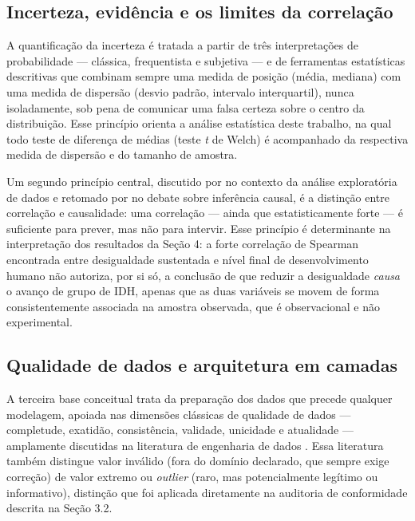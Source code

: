 \documentclass[11pt,a4paper]{article}
\begin{document}
\subsection{Incerteza, evidência e os limites da correlação}

A quantificação da incerteza é tratada a partir de três interpretações de probabilidade --- clássica, frequentista e subjetiva --- e de ferramentas estatísticas descritivas que combinam sempre uma medida de posição (média, mediana) com uma medida de dispersão (desvio padrão, intervalo interquartil), nunca isoladamente, sob pena de comunicar uma falsa certeza sobre o centro da distribuição. Esse princípio orienta a análise estatística deste trabalho, na qual todo teste de diferença de médias (teste \textit{t} de Welch) é acompanhado da respectiva medida de dispersão e do tamanho de amostra.

Um segundo princípio central, discutido por \citet{tukey1977} no contexto da análise exploratória de dados e retomado por \citet{pearl2018} no debate sobre inferência causal, é a distinção entre correlação e causalidade: uma correlação --- ainda que estatisticamente forte --- é suficiente para prever, mas não para intervir. Esse princípio é determinante na interpretação dos resultados da Seção 4: a forte correlação de Spearman encontrada entre desigualdade sustentada e nível final de desenvolvimento humano não autoriza, por si só, a conclusão de que reduzir a desigualdade \textit{causa} o avanço de grupo de IDH, apenas que as duas variáveis se movem de forma consistentemente associada na amostra observada, que é observacional e não experimental.

\subsection{Qualidade de dados e arquitetura em camadas}

A terceira base conceitual trata da preparação dos dados que precede qualquer modelagem, apoiada nas dimensões clássicas de qualidade de dados --- completude, exatidão, consistência, validade, unicidade e atualidade --- amplamente discutidas na literatura de engenharia de dados \citep{han2011,inmon2005,kimball2013}. Essa literatura também distingue valor inválido (fora do domínio declarado, que sempre exige correção) de valor extremo ou \textit{outlier} (raro, mas potencialmente legítimo ou informativo), distinção que foi aplicada diretamente na auditoria de conformidade descrita na Seção 3.2.
\end{document}
